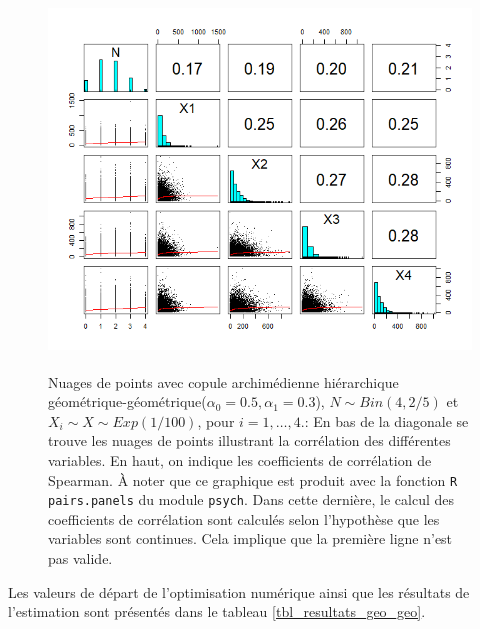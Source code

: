 \documentclass{article}
\begin{document}
		\begin{figure}[H]
			\centering
			\includegraphics[height=10cm]{Graph/scatterplot_geo_geo.png}
			\caption[Nuages de points du scénario \ref{scenario_geo_geo}]
			{Nuages de points avec copule archimédienne hiérarchique géométrique-géométrique($\alpha_0=0.5, \alpha_1 = 0.3$), $N \sim Bin(4, 2/5)$ et $X_i \sim X \sim Exp(1/100)$, pour $i=1,\dots, 4$.:
				En bas de la diagonale se trouve les nuages de points illustrant la corrélation des différentes variables. En haut, on indique les coefficients de corrélation de Spearman. À noter que ce graphique est produit avec la fonction \texttt{R} \texttt{pairs.panels} du module \texttt{psych}. Dans cette dernière, le calcul des coefficients de corrélation sont calculés selon l'hypothèse que les variables sont continues. Cela implique que la première ligne n'est pas valide.}
			\label{graph_scatterplot_geo_geo}
		\end{figure}
	
		Les valeurs de départ de l'optimisation numérique ainsi que les résultats de l'estimation sont présentés dans le tableau \ref{tbl_resultats_geo_geo}.
		
\end{document}
